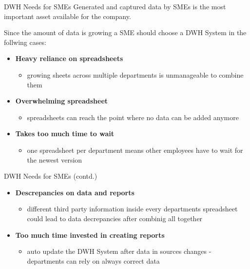 \documentclass[aspectratio=169]{beamer}
\begin{document}
  \begin{frame}{DWH Needs for SMEs}
    Generated and captured data by SMEs is the most important asset available for the company.

Since the amount of data is growing a SME should choose a DWH System in the follwing cases:
    \begin{itemize}
      \item \textbf{Heavy reliance on spreadsheets}
      	\begin{itemize}
      	   \item growing sheets across multiple departments is unmanageable to combine them
      	\end{itemize}
      \item \textbf{Overwhelming spreadsheet}
		\begin{itemize}
		   \item spreadsheets can reach the point where no data can be added anymore
      	\end{itemize}
      \item \textbf{Takes too much time to wait}
      	\begin{itemize}
      	   \item one spreadsheet per department means other employees have to wait for the newest version
      	\end{itemize}
    \end{itemize}
  \end{frame}
  
  \begin{frame}{DWH Needs for SMEs (contd.)}
    \begin{itemize}
      \item \textbf{Descrepancies on data and reports}
      	\begin{itemize}
      	   \item different third party information inside every departments spreadsheet could lead to data decrepancies after combinig all together
      	\end{itemize}
      \item \textbf{Too much time invested in creating reports}
        \begin{itemize}
      	   \item auto update the DWH System after data in sources changes - departments can rely on always correct data
      	\end{itemize}
    \end{itemize}
  \end{frame}
\end{document}
